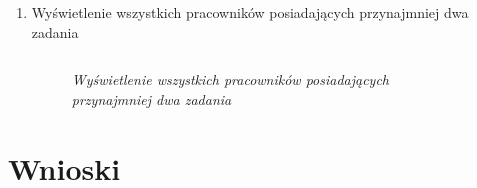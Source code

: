 \documentclass{article}
\begin{document}
\begin{enumerate}
\item Wyświetlenie wszystkich pracowników posiadających przynajmniej dwa zadania

\begin{lstlisting}[style=SQL, caption=\textit{Wyświetlenie wszystkich pracowników posiadających przynajmniej dwa zadania}]
\end{lstlisting}

\begin{figure}[H]
	\centering
	\caption{\textit{Wyświetlenie wszystkich pracowników posiadających przynajmniej dwa zadania}}
\end{figure}


\end{enumerate}
\section{Wnioski}
\end{document}
